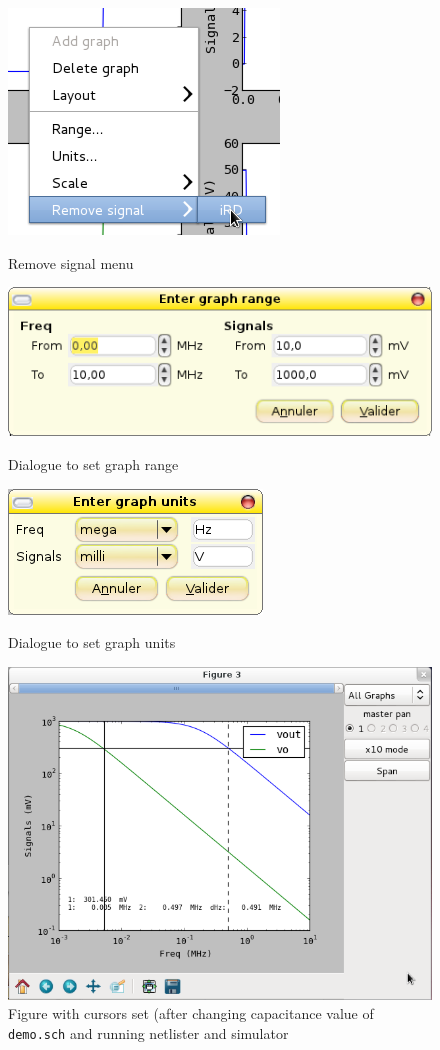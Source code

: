 \documentclass[a4paper,11pt]{report}
\begin{document}
\begin{figure}[htbp]
  \centering
  \includegraphics[scale=.5]{../png/ioscopy-remove.png}
  \caption{Remove signal menu}
  \label{fig:remove}

  \includegraphics[scale=.5]{../png/ioscopy-range.png}
  \caption{Dialogue to set graph range}
  \label{fig:range}

  \includegraphics[scale=.5]{../png/ioscopy-units.png}
  \caption{Dialogue to set graph units}
  \label{fig:units}

  \includegraphics[scale=.5]{../png/ioscopy-cursors.png}
  \caption{Figure with cursors set (after changing capacitance value of \texttt{demo.sch} and running netlister and simulator}
  \label{fig:cursors}

\end{figure}
\end{document}

